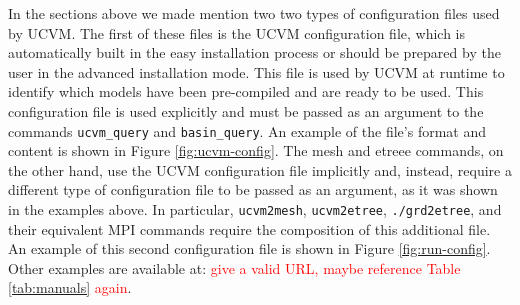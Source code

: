 In the sections above we made mention two two types of configuration files used by UCVM. The first of these files is the UCVM configuration file, which is automatically built in the easy installation process or should be prepared by the user in the advanced installation mode. This file is used by UCVM at runtime to identify which models have been pre-compiled and are ready to be used. This configuration file is used explicitly and must be passed as an argument to the commands \texttt{ucvm\_query} and \texttt{basin\_query}. An example of the file's format and content is shown in Figure \ref{fig:ucvm-config}. The mesh and etreee commands, on the other hand, use the UCVM configuration file implicitly and, instead, require a different type of configuration file to be passed as an argument, as it was shown in the examples above. In particular, \texttt{ucvm2mesh}, \texttt{ucvm2etree}, \texttt{./grd2etree}, and their equivalent MPI commands require the composition of this additional file. An example of this second configuration file is shown in Figure \ref{fig:run-config}. Other examples are available at: \textcolor{red}{give a valid URL, maybe reference Table \ref{tab:manuals} again}.


